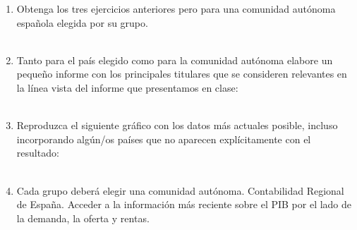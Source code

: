 \begin{enumerate}
    \item Obtenga los tres ejercicios anteriores pero para una comunidad autónoma española elegida por su grupo.\\\\

    \item Tanto para el país elegido como para la comunidad autónoma elabore un pequeño informe con los principales titulares que se consideren relevantes en la línea vista del informe que presentamos en clase:\\\\

    \item Reproduzca el siguiente gráfico con los datos más actuales posible, incluso incorporando algún/os países que no aparecen explícitamente con el resultado:\\\\

    \item Cada grupo deberá elegir una comunidad autónoma. Contabilidad Regional de España. Acceder a la información más reciente sobre el PIB por el lado de la demanda, la oferta y rentas. \\\\


\end{enumerate}
